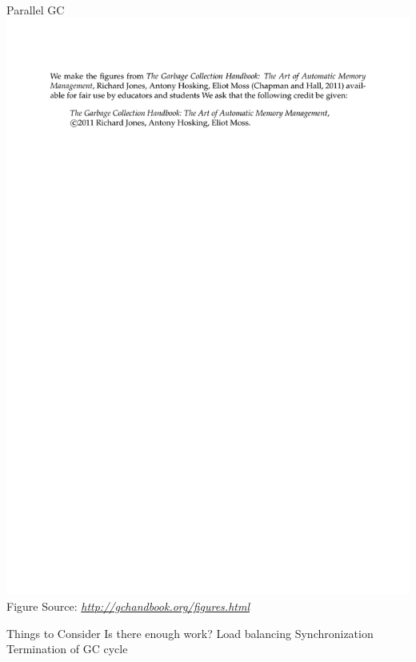 \documentclass[
14pt,
aspectratio=169,
usenames,
dvipsnames,
x11names]{beamer}
\newcommand{\src}[1]{\scriptsize Figure Source: \textit{#1}}
\begin{document}
\begin{frame}{Parallel GC}
  \centering
  \includegraphics[page=65,trim=0cm 7.5cm 0cm 9cm,height=.75\textheight]{gchandbookfigures}\\
  \src{\url{http://gchandbook.org/figures.html}}
\end{frame}

\begin{frame}{Things to Consider}
  Is there enough work?
  \vfill
  Load balancing
  \vfill
  Synchronization
  \vfill
  Termination of GC cycle
\end{frame}
\end{document}
